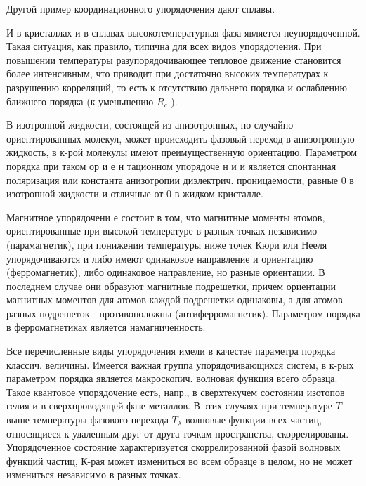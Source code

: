\documentclass[10pt]{article}
\begin{document}
Другой пример координационного упорядочения дают сплавы.



И в кристаллах и в сплавах высокотемпературная фаза является неупорядоченной. Такая ситуация, как правило, типична для всех видов упорядочения. При повышении температуры разупорядочивающее тепловое движение становится более интенсивным, что приводит при достаточно высоких температурах к разрушению корреляций, то есть к отсутствию дальнего порядка и ослаблению ближнего порядка (к уменьшению $R_{c}$ ).



В изотропной жидкости, состоящей из анизотропных, но случайно ориентированных молекул, может происходить фазовый переход в анизотропную жидкость, в к-рой молекулы имеют преимущественную ориентацию. Параметром порядка при таком ор и е н тационном упорядоче н и и является спонтанная поляризация или константа анизотропии диэлектрич. проницаемости, равные 0 в изотропной жидкости и отличные от 0 в жидком кристалле.



Магнитное упорядочени е состоит в том, что магнитные моменты атомов, ориентированные при высокой температуре в разных точках независимо (парамагнетик), при понижении температуры ниже точек Кюри или Нееля упорядочиваются и либо имеют одинаковое направление и ориентацию (ферромагнетик), либо одинаковое направление, но разные ориентации. В последнем случае они образуют магнитные подрешетки, причем ориентации магнитных моментов для атомов каждой подрешетки одинаковы, а для атомов разных подрешеток - противоположны (антиферромагнетик). Параметром порядка в ферромагнетиках является намагниченность.



Все перечисленные виды упорядочения имели в качестве параметра порядка классич. величины. Имеется важная группа упорядочивающихся систем, в к-рых параметром порядка является макроскопич. волновая функция всего образца. Такое квантовое упорядочение есть, напр., в сверхтекучем состоянии изотопов гелия и в сверхпроводящей фазе металлов. В этих случаях при температуре $T$ выше температуры фазового перехода $T_{\lambda}$ волновые функции всех частиц, относящиеся к удаленным друг от друга точкам пространства, скоррелированы. Упорядоченное состояние характеризуется скоррелированной фазой волновых функций частиц, К-рая может измениться во всем образце в целом, но не может измениться независимо в разных точках.
\end{document}

